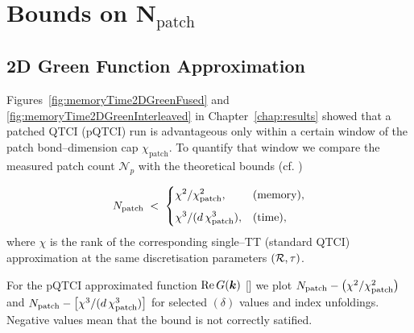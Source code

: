 \chapter{Bounds on \(\mathbf{N}_{\text{patch}}\)}
\label{app:bounds}
\section{2D Green Function Approximation}
\label{app:2DGreenbounds}

Figures~\ref{fig:memoryTime2DGreenFused} and
\ref{fig:memoryTime2DGreenInterleaved} in
Chapter~\ref{chap:results} showed that a patched QTCI (pQTCI) run is advantageous only within a certain window of the patch bond–dimension cap
\(\chi_{\text{patch}}\).   To quantify that window we compare the measured patch count \(\mathcal
N_{\!p}\) with the theoretical bounds (cf. ) 

\begin{equation}
    N_{\text{patch}}
    \;<\;
    \begin{cases}
      \displaystyle\chi^{2}/\chi_{\text{patch}}^{2}, & \text{(memory)},\\[6pt]
      \displaystyle\chi^{3}/(d\,\chi_{\text{patch}}^{3}), & \text{(time)},
    \end{cases}
  \label{eq:chiPatchBoundApp}
\end{equation}
where \(\chi\) is the rank of the corresponding single–TT (standard QTCI)
approximation at the same discretisation parameters \((\mathcal{R},\tau)\).

For the pQTCI approximated function \(\operatorname{Re}G(\boldsymbol{k})\) [] we plot \(N_{\text{patch}}-\bigl(\chi^{2}/\chi_{\text{patch}}^{2}\bigr)\) and
\(N_{\text{patch}}-\bigl[\chi^{3}/(d\,\chi_{\text{patch}}^{3})\bigr]\) for
selected \((\delta)\) values and index unfoldings.   Negative values mean that the bound is not correctly satified.

